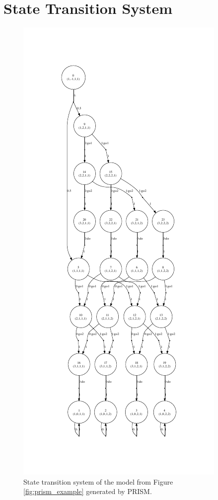 \documentclass{llncs}
\begin{document}
\appendix
\label{app:transitions}
\section{State Transition System}
\begin{figure}
  \centering
  \vspace{-50pt}
	\includegraphics[]{images/transition_system}
	\vspace{-35pt}
	\caption{State transition system of the model from Figure \ref{fig:prism_example} generated by PRISM.}
\end{figure}
\end{document}
